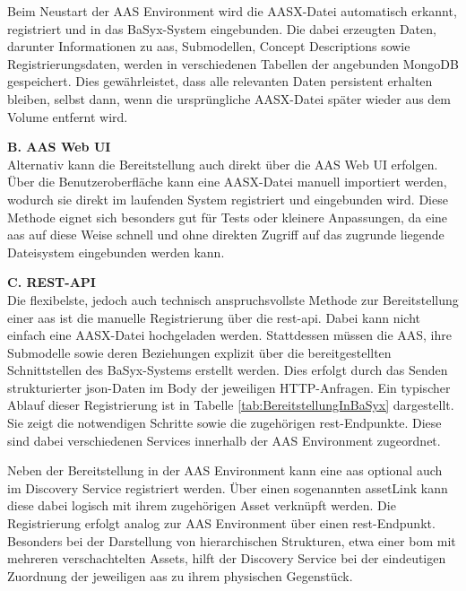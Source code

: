 Beim Neustart der AAS Environment wird die AASX-Datei automatisch erkannt, registriert und in das BaSyx-System eingebunden.
Die dabei erzeugten Daten, darunter Informationen zu \acs{aas}, Submodellen, Concept Descriptions sowie Registrierungsdaten, werden in verschiedenen Tabellen der angebunden MongoDB gespeichert.
Dies gewährleistet, dass alle relevanten Daten persistent erhalten bleiben, selbst dann, wenn die ursprüngliche AASX-Datei später wieder aus dem Volume entfernt wird.

\vspace{0.5em}
\noindent\textbf{B. AAS Web UI}\\
Alternativ kann die Bereitstellung auch direkt über die AAS Web UI erfolgen.
Über die Benutzeroberfläche kann eine AASX-Datei manuell importiert werden, wodurch sie direkt im laufenden System registriert und eingebunden wird.
Diese Methode eignet sich besonders gut für Tests oder kleinere Anpassungen, da eine \acs{aas} auf diese Weise schnell und ohne direkten Zugriff auf das zugrunde liegende Dateisystem eingebunden werden kann.

\vspace{0.5em}
\noindent\textbf{C. REST-API}\\
Die flexibelste, jedoch auch technisch anspruchsvollste Methode zur Bereitstellung einer \acs{aas} ist die manuelle Registrierung über die \acs{rest}-\acs{api}. 
Dabei kann nicht einfach eine AASX-Datei hochgeladen werden. 
Stattdessen müssen die AAS, ihre Submodelle sowie deren Beziehungen explizit über die bereitgestellten Schnittstellen des BaSyx-Systems erstellt werden. 
Dies erfolgt durch das Senden strukturierter \acs{json}-Daten im Body der jeweiligen HTTP-Anfragen.
Ein typischer Ablauf dieser Registrierung ist in Tabelle \ref{tab:BereitstellungInBaSyx} dargestellt. 
Sie zeigt die notwendigen Schritte sowie die zugehörigen \acs{rest}-Endpunkte.
Diese sind dabei verschiedenen Services innerhalb der AAS Environment zugeordnet.

\newpage


Neben der Bereitstellung in der AAS Environment kann eine \acs{aas} optional auch im Discovery Service registriert werden.
Über einen sogenannten assetLink kann diese dabei logisch mit ihrem zugehörigen Asset verknüpft werden.
Die Registrierung erfolgt analog zur AAS Environment über einen \acs{rest}-Endpunkt.
Besonders bei der Darstellung von hierarchischen Strukturen, etwa einer \acs{bom} mit mehreren verschachtelten Assets, hilft der Discovery Service bei der eindeutigen Zuordnung der jeweiligen \acs{aas} zu ihrem physischen Gegenstück.

